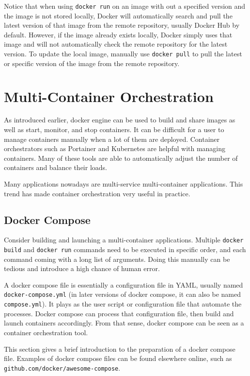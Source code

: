 Notice that when using \verb|docker run| on an image with out a specified version and the image is not stored locally, Docker will automatically search and pull the latest version of that image from the remote repository, usually Docker Hub by default. However, if the image already exists locally, Docker simply uses that image and will not automatically check the remote repository for the latest version. To update the local image, manually use \verb|docker pull| to pull the latest or specific version of the image from the remote repository.

\section{Multi-Container Orchestration}

As introduced earlier, docker engine can be used to build and share images as well as start, monitor, and stop containers. It can be difficult for a user to manage containers manually when a lot of them are deployed. Container orchestrators such as Portainer and Kubernetes are helpful with managing containers. Many of these tools are able to automatically adjust the number of containers and balance their loads.

Many applications nowadays are multi-service multi-container applications. This trend has made container orchestration very useful in practice.

\subsection{Docker Compose}

Consider building and launching a multi-container applications. Multiple \verb|docker build| and \verb|docker run| commands need to be executed in specific order, and each command coming with a long list of arguments. Doing this manually can be tedious and introduce a high chance of human error.

A docker compose file is essentially a configuration file in YAML, usually named \verb|docker-compose.yml| (in later versions of docker compose, it can also be named \verb|compose.yml|). It plays as the user script or configuration file that automate the processes. Docker compose can process that configuration file, then build and launch containers accordingly. From that sense, docker compose can be seen as a container orchestration tool. 

This section gives a brief introduction to the preparation of a docker compose file. Examples of docker compose files can be found elsewhere online, such as \texttt{github.com/docker/awesome-compose}. 

